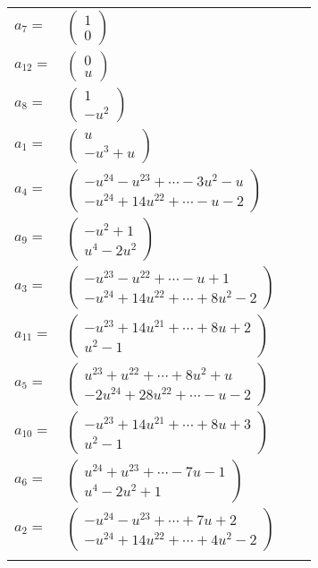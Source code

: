 \documentclass[1p]{elsarticle_modified}
\theoremstyle{definition}
\begin{document}
\begin{tabular}{m{7pt} m{180pt} m{7pt} m{180pt} }
\flushright $a_{7}=$&$\begin{pmatrix}1\\0\end{pmatrix}$ \\
\flushright $a_{12}=$&$\begin{pmatrix}0\\u\end{pmatrix}$ \\
\flushright $a_{8}=$&$\begin{pmatrix}1\\- u^2\end{pmatrix}$ \\
\flushright $a_{1}=$&$\begin{pmatrix}u\\- u^3+u\end{pmatrix}$ \\
\flushright $a_{4}=$&$\begin{pmatrix}- u^{24}- u^{23}+\cdots-3 u^2- u\\- u^{24}+14 u^{22}+\cdots- u-2\end{pmatrix}$ \\
\flushright $a_{9}=$&$\begin{pmatrix}- u^2+1\\u^4-2 u^2\end{pmatrix}$ \\
\flushright $a_{3}=$&$\begin{pmatrix}- u^{23}- u^{22}+\cdots- u+1\\- u^{24}+14 u^{22}+\cdots+8 u^2-2\end{pmatrix}$ \\
\flushright $a_{11}=$&$\begin{pmatrix}- u^{23}+14 u^{21}+\cdots+8 u+2\\u^2-1\end{pmatrix}$ \\
\flushright $a_{5}=$&$\begin{pmatrix}u^{23}+u^{22}+\cdots+8 u^2+u\\-2 u^{24}+28 u^{22}+\cdots- u-2\end{pmatrix}$ \\
\flushright $a_{10}=$&$\begin{pmatrix}- u^{23}+14 u^{21}+\cdots+8 u+3\\u^2-1\end{pmatrix}$ \\
\flushright $a_{6}=$&$\begin{pmatrix}u^{24}+u^{23}+\cdots-7 u-1\\u^4-2 u^2+1\end{pmatrix}$ \\
\flushright $a_{2}=$&$\begin{pmatrix}- u^{24}- u^{23}+\cdots+7 u+2\\- u^{24}+14 u^{22}+\cdots+4 u^2-2\end{pmatrix}$\\&\end{tabular}
\end{document}
